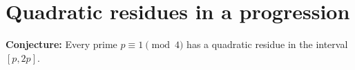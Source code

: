 \section{Quadratic residues in a progression}

\begin{conjecture}
\textbf{Conjecture:} Every prime $p \equiv 1 \pmod{4}$ has a quadratic
residue in the interval $[p,2p]$.
\end{conjecture}
